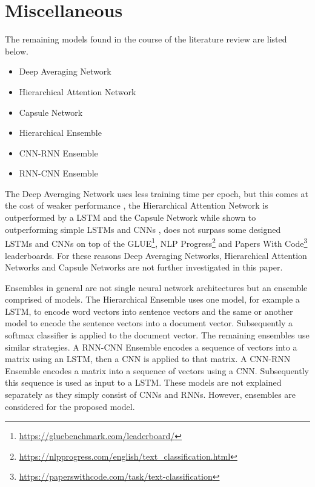 	\section{Miscellaneous}
	\label{sec:misc}
	 The remaining models found in the course of the literature review are listed below.
	 \begin{itemize}
	 	\item Deep Averaging Network
	 	\item Hierarchical Attention Network
	 	\item Capsule Network
	 	\item Hierarchical Ensemble
	 	\item CNN-RNN Ensemble
	 	\item RNN-CNN Ensemble
	 \end{itemize}
 	The Deep Averaging Network uses less training time per epoch, but this comes at the cost of weaker performance \autocites{Iyyer.2015}{Cer.2018},
 	the Hierarchical Attention Network is outperformed by a \ac{LSTM} \autocite{Adhikari.2019} and
 	the Capsule Network while shown to outperforming simple \ac{LSTM}s and \ac{CNN}s \autocites{Xiao.2018}{Kim.2018}{Srivastava.2018}{Ren.2018}{Zhao.2018}, does not surpass some designed \ac{LSTM}s and \ac{CNN}s on top of the GLUE\footnote{\url{https://gluebenchmark.com/leaderboard/}}, NLP Progress\footnote{\url{https://nlpprogress.com/english/text_classification.html}} and Papers With Code\footnote{\url{https://paperswithcode.com/task/text-classification}} leaderboards. For these reasons Deep Averaging Networks, Hierarchical Attention Networks and Capsule Networks are not further investigated in this paper.
 	\par
 	Ensembles in general are not single neural network architectures but an ensemble comprised of models. The Hierarchical Ensemble uses one model, for example a \ac{LSTM}, to encode word vectors into sentence vectors and the same or another model to encode the sentence vectors into a document vector. Subsequently a softmax classifier is applied to the document vector. The remaining ensembles use similar strategies. A RNN-CNN Ensemble encodes a sequence of vectors into a matrix using an \ac{LSTM}, then a \ac{CNN} is applied to that matrix. A CNN-RNN Ensemble encodes a matrix into a sequence of vectors using a \ac{CNN}. Subsequently this sequence is used as input to a \ac{LSTM}. These models are not explained separately as they simply consist of \ac{CNN}s and \ac{RNN}s. However, ensembles are considered for the proposed model.